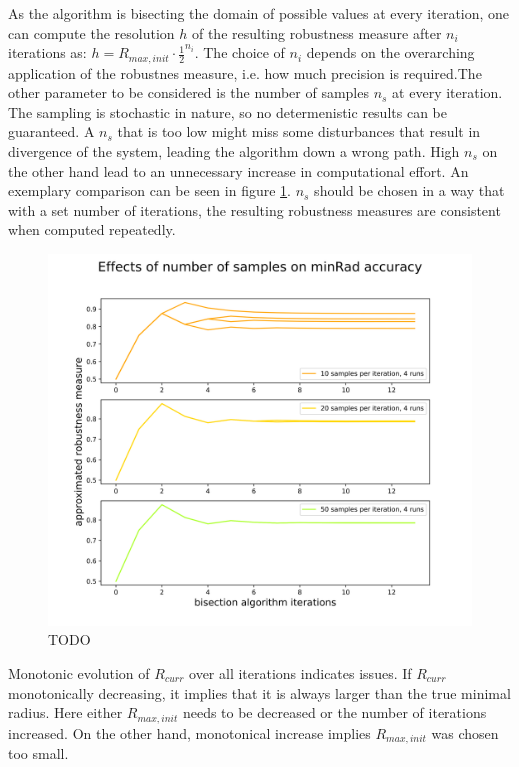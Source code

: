     As the algorithm is bisecting the domain of possible values at every iteration, one can compute the resolution $h$ of the resulting robustness measure after $n_i$ iterations as: $h = R_{max,init}\cdot\frac{1}{2}^{n_i}$. The choice of $n_i$ depends on the overarching application of the robustnes measure, i.e. how much precision is required.The other parameter to be considered is the number of samples $n_{s}$ at every iteration. The sampling is stochastic in nature, so no determenistic results can be guaranteed. A $n_{s}$ that is too low might miss some disturbances that result in divergence of the system, leading the algorithm down a wrong path. High $n_{s}$ on the other hand lead to an unnecessary increase in computational effort. An exemplary comparison can be seen in figure \ref{fig:minradcomp}. 
    $n_{s}$ should be chosen in a way that with a set number of iterations, the resulting robustness measures are consistent when computed repeatedly. 

    \begin{figure}[ht] 
    
    \includegraphics[width=.9\linewidth]{figures/minRad_tuning_graph.png}
    \caption{TODO}
    \label{fig:minradcomp}
    \end{figure}

    Monotonic evolution of $R_{curr}$ over all iterations indicates issues. If $R_{curr}$ monotonically decreasing, it implies that it is always larger than the true minimal radius. Here either $R_{max,init}$ needs to be decreased or the number of iterations increased. On the other hand, monotonical increase implies $R_{max,init}$ was chosen too small.

